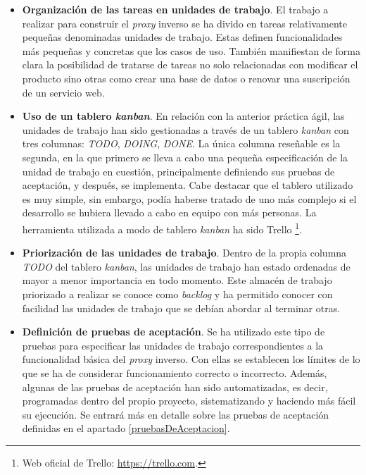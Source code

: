 \documentclass[11pt,spanish,listoffigures]{tfgetsinf}
\begin{document}
\begin{itemize}

	\item \textbf{Organización de las tareas en unidades de trabajo}. El trabajo a realizar para construir el \emph{proxy} inverso se ha divido en tareas relativamente pequeñas denominadas unidades de trabajo. Estas definen funcionalidades más pequeñas y concretas que los casos de uso. También manifiestan de forma clara la posibilidad de tratarse de tareas no solo relacionadas con modificar el producto sino otras como crear una base de datos o renovar una suscripción de un servicio web.

	\item \textbf{Uso de un tablero \emph{kanban}}. En relación con la anterior práctica ágil, las unidades de trabajo han sido gestionadas a través de un tablero \emph{kanban} con tres columnas: \emph{TODO}, \emph{DOING}, \emph{DONE}. La única columna reseñable es la segunda, en la que primero se lleva a cabo una pequeña especificación de la unidad de trabajo en cuestión, principalmente definiendo sus pruebas de aceptación, y después, se implementa. Cabe destacar que el tablero utilizado es muy simple, sin embargo, podía haberse tratado de uno más complejo si el desarrollo se hubiera llevado a cabo en equipo con más personas. La herramienta utilizada a modo de tablero \emph{kanban} ha sido Trello \footnote{Web oficial de Trello: \url{https://trello.com}.}.

	\item \textbf{Priorización de las unidades de trabajo}. Dentro de la propia columna \emph{TODO} del tablero \emph{kanban}, las unidades de trabajo han estado ordenadas de mayor a menor importancia en todo momento. Este almacén de trabajo priorizado a realizar se conoce como \emph{backlog} y ha permitido conocer con facilidad las unidades de trabajo que se debían abordar al terminar otras.

	\item \textbf{Definición de pruebas de aceptación}. Se ha utilizado este tipo de pruebas para especificar las unidades de trabajo correspondientes a la funcionalidad básica del \emph{proxy} inverso. Con ellas se establecen los límites de lo que se ha de considerar funcionamiento correcto o incorrecto. Además, algunas de las pruebas de aceptación han sido automatizadas, es decir, programadas dentro del propio proyecto, sistematizando y haciendo más fácil su ejecución. Se entrará más en detalle sobre las pruebas de aceptación definidas en el apartado \ref{pruebasDeAceptacion}.


\end{itemize}
\end{document}
